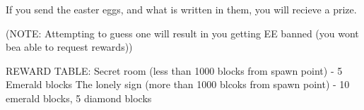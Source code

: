 If you send the easter eggs, and what is written in them, you will recieve a prize.

(NOTE: Attempting to guess one will result in you getting EE banned (you wont bea able to request rewards))

REWARD TABLE:
Secret room (less than 1000 blocks from spawn point) - 5 Emerald blocks
The lonely sign (more than 1000 blcoks from spawn point) - 10 emerald blocks, 5 diamond blocks
